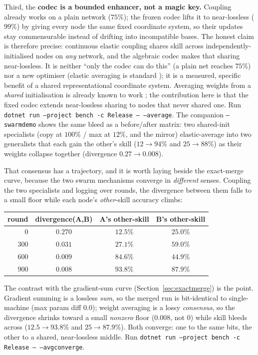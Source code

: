 \documentclass[11pt]{article}
\newcommand{\code}[1]{\texttt{#1}}
\begin{document}
Third, the \textbf{codec is a bounded enhancer, not a magic key.} Coupling already works on a plain
network ($75\%$); the frozen codec lifts it to near-lossless ($99\%$) by giving every node the same fixed
coordinate system, so their updates stay commensurable instead of drifting into incompatible bases. The
honest claim is therefore precise: continuous elastic coupling shares skill across
independently-initialised nodes on \emph{any} network, and the algebraic codec makes that sharing
near-lossless. It is neither ``only the codec can do this'' (a plain net reaches $75\%$) nor a new
optimiser (elastic averaging is standard \parencite{zhang2015easgd}); it is a measured, specific benefit
of a shared representational coordinate system. Averaging weights from a \emph{shared} initialisation is
already known to work \parencite{wortsman2022soups}; the contribution here is that the fixed codec extends
near-lossless sharing to nodes that never shared one. Run
\code{dotnet run --project bench -c Release -- --average}. The companion \code{--swarmdemo} shows the same
bleed as a before/after matrix: two shared-init specialists (copy at $100\%$ / max at $12\%$, and the
mirror) elastic-average into two generalists that each gain the other's skill ($12\to94\%$ and
$25\to88\%$) as their weights collapse together (divergence $0.27\to0.008$).

That consensus has a trajectory, and it is worth laying beside the exact-merge curve, because the two
swarm mechanisms converge in \emph{different} senses. Coupling the two specialists and logging over rounds,
the divergence between them falls to a small floor while each node's \emph{other}-skill accuracy climbs:

\begin{center}
\begin{tabular}{@{}rccc@{}}
\toprule
round & divergence(A,B) & A's other-skill & B's other-skill \\
\midrule
0   & $0.270$ & $12.5\%$ & $25.0\%$ \\
300 & $0.031$ & $27.1\%$ & $59.0\%$ \\
600 & $0.009$ & $84.6\%$ & $44.9\%$ \\
900 & $0.008$ & $93.8\%$ & $87.9\%$ \\
\bottomrule
\end{tabular}
\end{center}

The contrast with the gradient-sum curve (Section~\ref{sec:exactmerge}) is the point. Gradient summing is a
lossless \emph{sum}, so the merged run is bit-identical to single-machine (max param diff $0.0$); weight
averaging is a lossy \emph{consensus}, so the divergence shrinks toward a small \emph{nonzero} floor
($0.008$, not $0$) while skill bleeds across ($12.5\to93.8\%$ and $25\to87.9\%$). Both converge: one to the
same bits, the other to a shared, near-lossless middle. Run
\code{dotnet run --project bench -c Release -- --avgconverge}.
\end{document}
